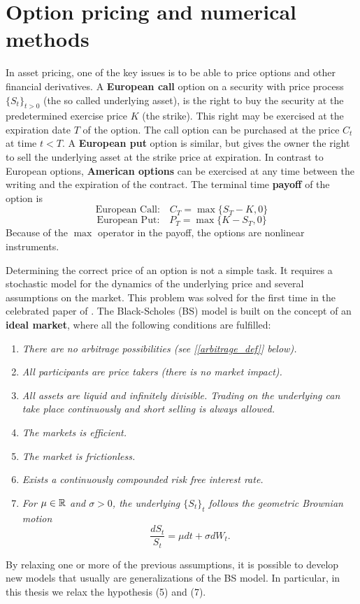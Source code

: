 

\chapter{Option pricing and numerical methods}\label{Chapter2}
\minitoc%

\vspace{5em}


In asset pricing, one of the key issues is to be able to price options and other financial derivatives. 
A \textbf{European call} option on a security with price process $\{S_t\}_{t>0}$ (the so called underlying asset), is the right to 
buy the security at the predetermined exercise price $K$ (the strike). This right may be exercised at the expiration date $T$ of the option.
The call option can be purchased at the price $C_t$ at time $t<T$.
A \textbf{European put} option is similar, but gives the owner the right to sell the underlying asset at the strike price at expiration. 
In contrast to European options, \textbf{American options} can be exercised at any time between the writing and the expiration of the contract.
The terminal time \textbf{payoff} of the option is
$$ \mbox{European Call:} \quad C_T = \max \{ S_T - K, 0 \} $$
$$ \mbox{European Put:} \quad P_T = \max \{ K - S_T, 0 \} $$
Because of the $\max$ operator in the payoff, the options are nonlinear instruments. 

Determining the correct price of an option is not a simple task. 
It requires a stochastic model for the dynamics of the underlying price and several assumptions on the market.
This problem was solved for the first time in the celebrated paper of \cite{BS73}. 
The Black-Scholes (BS) model is built on the concept of an \textbf{ideal market}, where all the following 
conditions are fulfilled:  
\begin{enumerate}
 \item \emph{There are no arbitrage possibilities (see [\ref{arbitrage_def}] below).}
 \item \emph{All participants are price takers (there is no market impact).}
 \item \emph{All assets are liquid and infinitely divisible. Trading on the underlying can take place continuously and short selling is always allowed.}
 \item \emph{The markets is efficient.}
 \item \emph{The market is frictionless.}
 \item \emph{Exists a continuously compounded risk free interest rate.}
 \item \emph{For $\mu \in \mathbb{R}$ and $\sigma > 0$, the underlying $\{S_t\}_t$ follows the geometric Brownian motion}
	\begin{equation}\label{GBM2}
	  \frac{dS_t}{S_t} = \mu dt + \sigma dW_t.
	\end{equation}
\end{enumerate}
By relaxing one or more of the previous assumptions, it is possible to develop new models that usually are generalizations of the BS model.
In particular, in this thesis we relax the hypothesis (5) and (7). 

